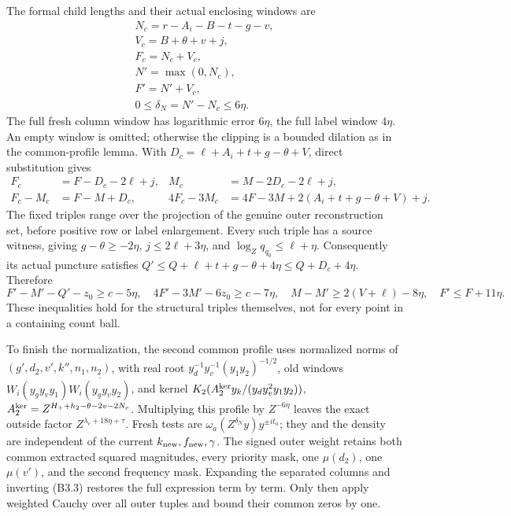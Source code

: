 \documentclass[11pt,a4paper]{article}
\begin{document}
The formal child lengths and their actual enclosing windows are \[
\begin{gathered}
N_c=r-A_i-B-t-g-v,\\ V_c=B+\theta+v+j,\\ F_c=N_c+V_c,
\\ N'=\max(0,N_c),\\ F'=N'+V_c,
\\0\le\delta_N=N'-N_c\le6\eta.
\end{gathered}
\tag{B3.24}
\] The full fresh column window has logarithmic error \(6\eta\), the
full label window \(4\eta\). An empty window is omitted; otherwise the
clipping is a bounded dilation as in the common-profile lemma. With
\(D_c=\ell+A_i+t+g-\theta+V\), direct substitution gives \[
\begin{aligned}
F_c&=F-D_c-2\ell+j,&M_c&=M-2D_c-2\ell+j,\\
F_c-M_c&=F-M+D_c,&
4F_c-3M_c&=4F-3M+2(A_i+t+g-\theta+V)+j.
\end{aligned}\tag{B3.25}
\] The fixed triples range over the projection of the genuine outer
reconstruction set, before positive row or label enlargement. Every such
triple has a source witness, giving \(g-\theta\ge-2\eta\),
\(j\le2\ell+3\eta\), and \(\log_Zq_{q_0}\le\ell+\eta\). Consequently its
actual puncture satisfies
\(Q'\le Q+\ell+t+g-\theta+4\eta\le Q+D_c+4\eta\). Therefore \[
F'-M'-Q'-z_0\ge c-5\eta,\quad
4F'-3M'-6z_0\ge c-7\eta,\quad
M-M'\ge2(V+\ell)-8\eta,\quad F'\le F+11\eta.
\tag{B3.26}
\] These inequalities hold for the structural triples themselves, not
for every point in a containing count ball.

To finish the normalization, the second common profile uses normalized
norms of \((g',\allowbreak{}d_2,\allowbreak{}v',\allowbreak{}k'',\allowbreak{}n_1,\allowbreak{}n_2)\), with real root
\(y_d^{-1}y_v^{-1}(y_1y_2)^{-1/2}\), old windows
\(W_i(y_gy_vy_1)\overline{W_i(y_gy_vy_2)}\), and kernel
\(K_2(A_2^{\rm ker}y_k/(y_dy_v^2y_1y_2))\),
\(A_2^{\rm ker}=Z^{H_++h_2-\theta-2v-2N_c}\). Multiplying this profile
by \(Z^{-6\eta}\) leaves the exact outside factor
\(Z^{\lambda_c+18\eta+\tau}\). Fresh tests are
\(\omega_a(Z^{\delta_N}y)y^{\pm i t_a}\); they and the density are
independent of the current \(k_{\rm new},\allowbreak{}f_{\rm new},\allowbreak{}\gamma\). The
signed outer weight retains both common extracted squared magnitudes,
every priority mask, one \(\mu(d_2)\), one \(\mu(v')\), and the second
frequency mask. Expanding the separated columns and inverting (B3.3)
restores the full expression term by term. Only then apply weighted
Cauchy over all outer tuples and bound their common zeros by one.
\end{document}
